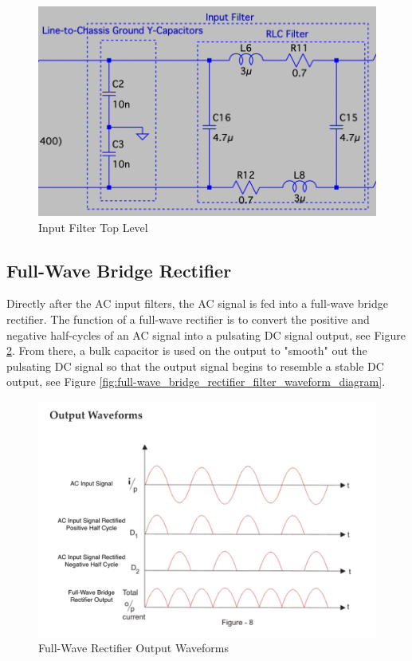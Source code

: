 \documentclass[conference]{IEEEtran}
\begin{document}
\begin{figure}[htp]
    \centering
    \includegraphics[width=1.0\linewidth]{input_filter_top_level.png}
    \caption{Input Filter Top Level}
    \label{fig:input_filter_top_level_diagram}
\end{figure}

\subsection{Full-Wave Bridge Rectifier}
Directly after the AC input filters, the AC signal is fed into a full-wave bridge rectifier. The function of a full-wave rectifier is to convert the positive and negative half-cycles of an AC signal into a pulsating DC signal output, see Figure \ref{fig:full-wave_rectifier_output_waveform_diagram}. From there, a bulk capacitor is used on the output to "smooth" out the pulsating DC signal so that the output signal begins to resemble a stable DC output, see Figure \ref{fig:full-wave_bridge_rectifier_filter_waveform_diagram}. 

\begin{figure}[htp]
    \centering
    \includegraphics[width=1.0\linewidth]{full-wave_bridge_rectifier_output_waveform.png}
    \caption{Full-Wave Rectifier Output Waveforms}
    \label{fig:full-wave_rectifier_output_waveform_diagram}
\end{figure}
\end{document}
